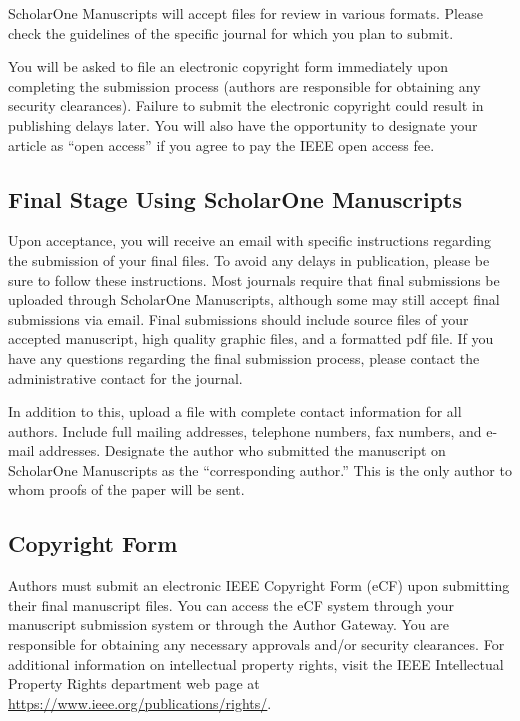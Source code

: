\documentclass{ieeeojies}
\begin{document}
ScholarOne Manuscripts will accept files for review in various formats.
Please check the guidelines of the specific journal for which you plan to
submit.

You will be asked to file an electronic copyright form immediately upon
completing the submission process (authors are responsible for obtaining any
security clearances). Failure to submit the electronic copyright could
result in publishing delays later. You will also have the opportunity to
designate your article as ``open access'' if you agree to pay the IEEE open
access fee.

\subsection{Final Stage Using ScholarOne Manuscripts}
Upon acceptance, you will receive an email with specific instructions
regarding the submission of your final files. To avoid any delays in
publication, please be sure to follow these instructions. Most journals
require that final submissions be uploaded through ScholarOne Manuscripts,
although some may still accept final submissions via email. Final
submissions should include source files of your accepted manuscript, high
quality graphic files, and a formatted pdf file. If you have any questions
regarding the final submission process, please contact the administrative
contact for the journal.

In addition to this, upload a file with complete contact information for all
authors. Include full mailing addresses, telephone numbers, fax numbers, and
e-mail addresses. Designate the author who submitted the manuscript on
ScholarOne Manuscripts as the ``corresponding author.'' This is the only
author to whom proofs of the paper will be sent.

\subsection{Copyright Form}
Authors must submit an electronic IEEE Copyright Form (eCF) upon submitting
their final manuscript files. You can access the eCF system through your
manuscript submission system or through the Author Gateway. You are
responsible for obtaining any necessary approvals and/or security
clearances. For additional information on intellectual property rights,
visit the IEEE Intellectual Property Rights department web page at
\underline{https://www.ieee.org/publications/rights/}.
\end{document}

